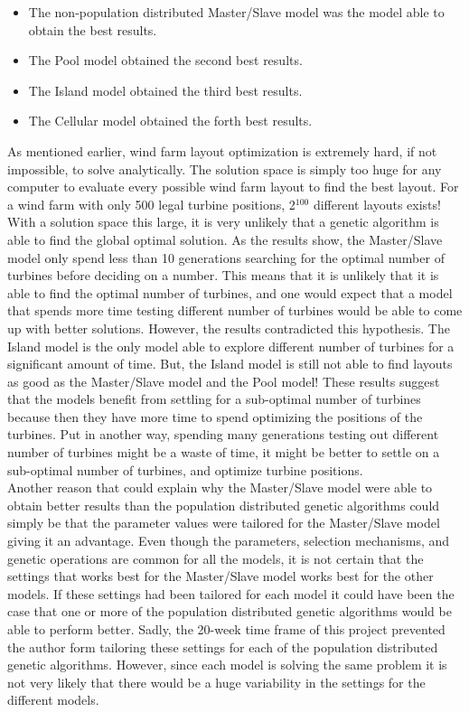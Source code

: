 \begin{itemize}
\item The non-population distributed Master/Slave model was the model able to obtain the best results. 
\item The Pool model obtained the second best results.
\item The Island model obtained the third best results.
\item The Cellular model obtained the forth best results.
\end{itemize}

\noindent As mentioned earlier, wind farm layout optimization is extremely hard, if not impossible, to solve analytically. The solution space is simply too huge for any computer to evaluate every possible wind farm layout to find the best layout. For a wind farm with only 500 legal turbine positions, 2$^{100}$ different layouts exists! With a solution space this large, it is very unlikely that a genetic algorithm is able to find the global optimal solution. As the results show, the Master/Slave model only spend less than 10 generations searching for the optimal number of turbines before deciding on a number. This means that it is unlikely that it is able to find the optimal number of turbines, and one would expect that a model that spends more time testing different number of turbines would be able to come up with better solutions. However, the results contradicted this hypothesis. The Island model is the only model able to explore different number of turbines for a significant amount of time. But, the Island model is still not able to find layouts as good as the Master/Slave model and the Pool model! These results suggest that the models benefit from settling for a sub-optimal number of turbines because then they have more time to spend optimizing the positions of the turbines. Put in another way, spending many generations testing out different number of turbines might be a waste of time, it might be better to settle on a sub-optimal number of turbines, and optimize turbine positions.\\


\noindent Another reason that could explain why the Master/Slave model were able to obtain better results than the population distributed genetic algorithms could simply be that the parameter values were tailored for the Master/Slave model giving it an advantage. Even though the parameters, selection mechanisms, and genetic operations are common for all the models, it is not certain that the settings that works best for the Master/Slave model works best for the other models. If these settings had been tailored for each model it could have been the case that one or more of the population distributed genetic algorithms would be able to perform better. Sadly, the 20-week time frame of this project prevented the author form tailoring these settings for each of the population distributed genetic algorithms. However, since each model is solving the same problem it is not very likely that there would be a huge variability in the settings for the different models.\\

